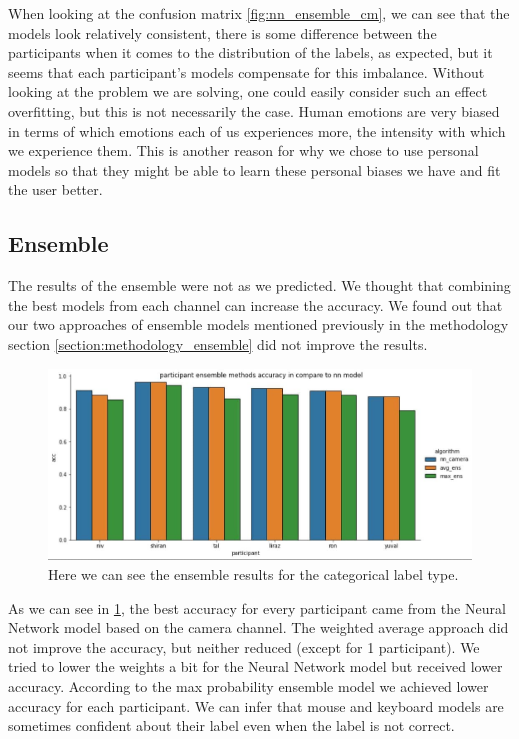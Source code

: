 \documentclass[../main.tex]{subfiles}
\begin{document}
    When looking at the confusion matrix \ref{fig:nn_ensemble_cm}, we can see that the models look relatively consistent, 
    there is some difference between the participants when it comes to the distribution of the labels, 
    as expected, but it seems that each participant's models compensate for this imbalance. Without looking at the 
    problem we are solving, one could easily consider such an effect overfitting, but this is not necessarily the case. 
    Human emotions are very biased in terms of which emotions each of us experiences more, the intensity with which we experience them. 
    This is another reason for why we chose to use personal models so that they might be able to learn these personal biases we have and fit the user better.

    \newpage
    
    \subsection{Ensemble}

    The results of the ensemble were not as we predicted. We thought that combining the best models from each channel can increase the accuracy. 
    We found out that our two approaches of ensemble models mentioned previously in the methodology section \ref{section:methodology_ensemble} 
    did not improve the results. 

    \begin{figure}[!htp]
        \centering
        \includegraphics[width=14cm]{figures/results/categorical_ensemble}   
        \caption{Here we can see the ensemble results for the categorical label type.}
        \label{fig:categorical_ensemble} 
    \end{figure}

    As we can see in \ref{fig:categorical_ensemble}, the best accuracy for every participant came from the Neural Network model based on the camera channel. 
    The weighted average approach did not improve the accuracy, but neither reduced (except for 1 participant). 
    We tried to lower the weights a bit for the Neural Network model but received lower accuracy.
    According to the max probability ensemble model we achieved lower accuracy for each participant. 
    We can infer that mouse and keyboard models are sometimes confident about their label even when the label is not correct.
\end{document}
